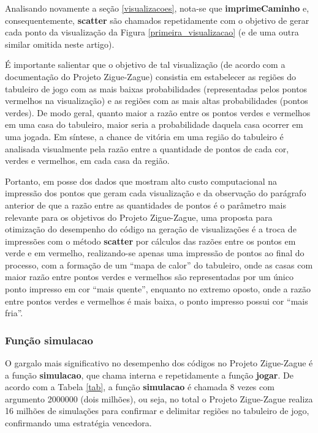 \documentclass[12pt]{article}
\newcommand{\aspas}[1]{``#1''} %
\begin{document}
Analisando novamente a seção \ref{visualizacoes}, nota-se que \textbf{imprimeCaminho} e, consequentemente, \textbf{scatter} são chamados repetidamente com o objetivo de gerar cada ponto da visualização da Figura \ref{primeira_visualizacao} (e de uma outra similar omitida neste artigo). 

É importante salientar que o objetivo de tal visualização (de acordo com a documentação do Projeto Zigue-Zague) consistia em estabelecer as regiões do tabuleiro de jogo com as mais baixas probabilidades (representadas pelos pontos vermelhos na visualização) e as regiões com as mais altas probabilidades (pontos verdes). De modo geral, quanto maior a razão entre os pontos verdes e vermelhos em uma casa do tabuleiro, maior seria a probabilidade daquela casa ocorrer em uma jogada. Em síntese, a chance de vitória em uma região do tabuleiro é analisada visualmente pela razão entre a quantidade de pontos de cada cor, verdes e vermelhos, em cada casa da região.

Portanto, em posse dos dados que mostram alto custo computacional na impressão dos pontos que geram cada visualização e da observação do parágrafo anterior de que a razão entre as quantidades de pontos é o parâmetro mais relevante para os objetivos do Projeto Zigue-Zague, uma proposta para otimização do desempenho do código na geração de visualizações é a troca de impressões com o método \textbf{scatter} por cálculos das razões entre os pontos em verde e em vermelho, realizando-se apenas uma impressão de pontos ao final do processo, com a formação de um \aspas{mapa de calor} do tabuleiro, onde as casas com maior razão entre pontos verdes e vermelhos são representadas por um único ponto impresso em cor \aspas{mais quente}, enquanto no extremo oposto, onde a razão entre pontos verdes e vermelhos é mais baixa, o ponto impresso possui cor \aspas{mais fria}.

\subsubsection{Função simulacao}

O gargalo mais significativo no desempenho dos códigos no Projeto Zigue-Zague é a função \textbf{simulacao}, que chama interna e repetidamente a função \textbf{jogar}. De acordo com a Tabela \ref{tab}, a função \textbf{simulacao} é chamada 8 vezes com argumento 2000000 (dois milhões), ou seja, no total o Projeto Zigue-Zague realiza 16 milhões de simulações para confirmar e delimitar regiões no tabuleiro de jogo, confirmando uma estratégia vencedora.
\end{document}
